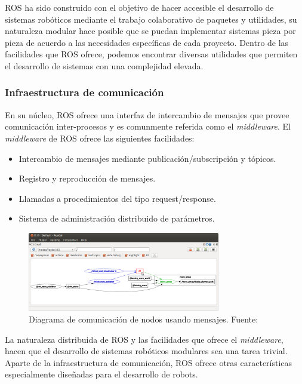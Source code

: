     ROS ha sido construido con el objetivo de hacer accesible el desarrollo de sistemas robóticos mediante el trabajo 
    colaborativo de paquetes y utilidades, su naturaleza modular hace posible que se puedan implementar sistemas pieza 
    por pieza de acuerdo a las necesidades específicas de cada proyecto. Dentro de las facilidades que ROS ofrece, podemos 
    encontrar diversas utilidades que permiten el desarrollo de sistemas con una complejidad elevada.

        \subsubsection{Infraestructura de comunicación}
        En su núcleo, ROS ofrece una interfaz de intercambio de mensajes que provee comunicación inter-procesos y es 
        comunmente referida como el \textit{middleware}. El \textit{middleware} de ROS ofrece las siguientes facilidades:

        \begin{itemize}
            \item Intercambio de mensajes mediante publicación/subscripción y tópicos.
            \item Registro y reproducción de mensajes.
            \item Llamadas a procedimientos del tipo request/response.
            \item Sistema de administración distribuido de parámetros.
        \end{itemize}

        \begin{figure}[!h] 
            \centering
            \includegraphics[width=0.75\textwidth]{img/rqtgraph}
            \caption{Diagrama de comunicación de nodos usando mensajes. Fuente: \cite{roswiki} }
            \label{fig:rqtgraph}
        \end{figure}

        La naturaleza distribuida de ROS y las facilidades que ofrece el \textit{middleware}, hacen que el desarrollo de sistemas 
        robóticos modulares sea una tarea trivial. Aparte de la infraestructura de comunicación, ROS ofrece otras características
        especialmente diseñadas para el desarrollo de robots.
        
